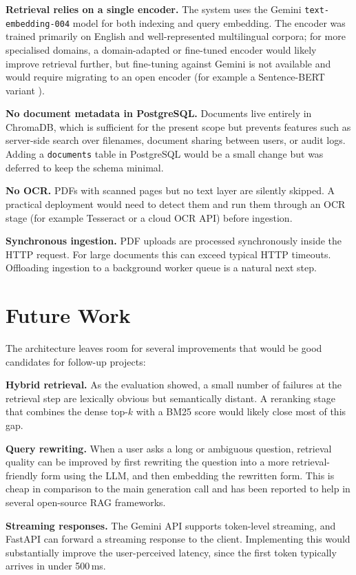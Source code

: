 \textbf{Retrieval relies on a single encoder.} The system uses the
Gemini \texttt{text-embedding-004} model for both indexing and query
embedding. The encoder was trained primarily on English and
well-represented multilingual corpora; for more specialised domains, a
domain-adapted or fine-tuned encoder would likely improve retrieval
further, but fine-tuning against Gemini is not available and would
require migrating to an open encoder (for example a Sentence-BERT
variant \cite{Reimers2019SentenceBERT}).

\textbf{No document metadata in PostgreSQL.} Documents live entirely in
ChromaDB, which is sufficient for the present scope but prevents
features such as server-side search over filenames, document sharing
between users, or audit logs. Adding a \texttt{documents} table in
PostgreSQL would be a small change but was deferred to keep the schema
minimal.

\textbf{No OCR.} PDFs with scanned pages but no text layer are silently
skipped. A practical deployment would need to detect them and run them
through an OCR stage (for example Tesseract or a cloud OCR API) before
ingestion.

\textbf{Synchronous ingestion.} PDF uploads are processed synchronously
inside the HTTP request. For large documents this can exceed typical
HTTP timeouts. Offloading ingestion to a background worker queue is a
natural next step.

\section{Future Work}
\label{sec:future-work}

The architecture leaves room for several improvements that would be
good candidates for follow-up projects:

\textbf{Hybrid retrieval.} As the evaluation showed, a small number of
failures at the retrieval step are lexically obvious but semantically
distant. A reranking stage that combines the dense top-$k$ with a BM25
score would likely close most of this gap.

\textbf{Query rewriting.} When a user asks a long or ambiguous question,
retrieval quality can be improved by first rewriting the question into
a more retrieval-friendly form using the LLM, and then embedding the
rewritten form. This is cheap in comparison to the main generation
call and has been reported to help in several open-source RAG
frameworks.

\textbf{Streaming responses.} The Gemini API supports token-level
streaming, and FastAPI can forward a streaming response to the client.
Implementing this would substantially improve the user-perceived
latency, since the first token typically arrives in under 500\,ms.

